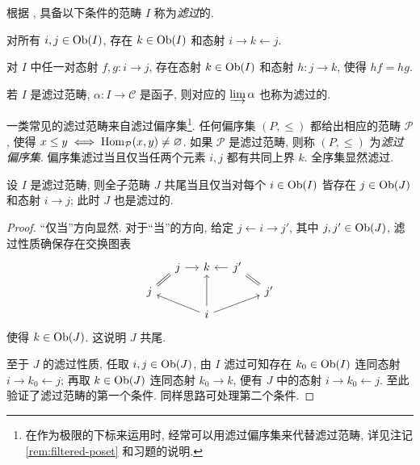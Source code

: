 \begin{definition}
	根据 \cite[定义 2.7.6]{Li1}, 具备以下条件的范畴 $I$ 称为\emph{滤过}的.
	\begin{compactitem}
		\item 对所有 $i, j \in \operatorname{Ob}(I)$, 存在 $k \in \operatorname{Ob}(I)$ 和态射 $i \rightarrow k \leftarrow j$.
		\item 对 $I$ 中任一对态射 $f, g: i \to j$, 存在态射 $k \in \operatorname{Ob}(I)$ 和态射 $h: j \to k$, 使得 $hf = hg$.
	\end{compactitem}

	若 $I$ 是滤过范畴, $\alpha: I \to \mathcal{C}$ 是函子, 则对应的 $\varinjlim \alpha$ 也称为滤过的.
\end{definition}

\begin{example}\label{eg:filtered-poset}
	一类常见的滤过范畴来自滤过偏序集\footnote{在作为极限的下标来运用时, 经常可以用滤过偏序集来代替滤过范畴, 详见注记 \ref{rem:filtered-poset} 和习题的说明.}. 任何偏序集 $(P, \leq)$ 都给出相应的范畴 $\mathcal{P}$, 使得 $x \leq y  \iff \operatorname{Hom}_{\mathcal{P}}(x, y) \neq \varnothing$. 如果 $\mathcal{P}$ 是滤过范畴, 则称 $(P, \leq)$ 为\emph{滤过偏序集}. 偏序集滤过当且仅当任两个元素 $i, j$ 都有共同上界 $k$. 全序集显然滤过.
\end{example}

\begin{proposition}\label{prop:cofinal-filtered}
	设 $I$ 是滤过范畴, 则全子范畴 $J$ 共尾当且仅当对每个 $i \in \operatorname{Ob}(I)$ 皆存在 $j \in \operatorname{Ob}(J)$ 和态射 $i \to j$; 此时 $J$ 也是滤过的.
\end{proposition}
\begin{proof}
	``仅当''方向显然. 对于``当''的方向, 给定 $j \leftarrow i \to j'$, 其中 $j, j' \in \operatorname{Ob}(J)$, 滤过性质确保存在交换图表
	\[\begin{tikzcd}[row sep=tiny, column sep=small]
		& j \arrow[r] & k & j' \arrow[l] & \\
		j \arrow[equal, ru] & & & & j' \arrow[equal, lu] \\
		& & i \arrow[llu] \arrow[uu] \arrow[rru] & &
	\end{tikzcd}\]
	使得 $k \in \operatorname{Ob}(J)$. 这说明 $J$ 共尾.
	
	至于 $J$ 的滤过性质, 任取 $i, j \in \operatorname{Ob}(J)$, 由 $I$ 滤过可知存在 $k_0 \in \operatorname{Ob}(I)$ 连同态射 $i \rightarrow k_0 \leftarrow j$; 再取 $k \in \operatorname{Ob}(J)$ 连同态射 $k_0 \to k$, 便有 $J$ 中的态射 $i \rightarrow k_0 \leftarrow j$. 至此验证了滤过范畴的第一个条件. 同样思路可处理第二个条件.
\end{proof}

